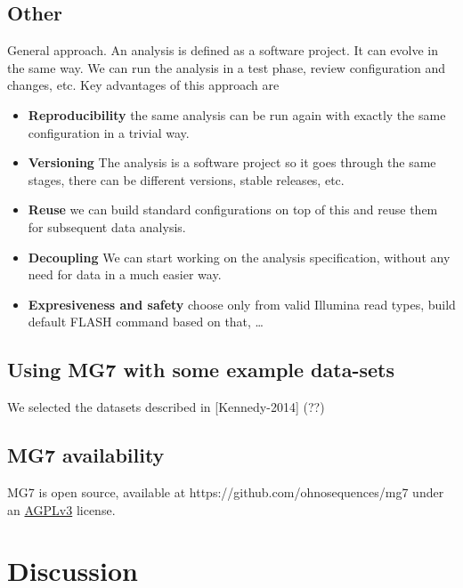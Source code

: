 \documentclass{frontiersSCNS} %
\providecommand{\tightlist}{%
\setlength{\itemsep}{0pt}\setlength{\parskip}{0pt}}
\begin{document}
\subsection{Other}\label{other}

General approach. An analysis is defined as a software project. It can
evolve in the same way. We can run the analysis in a test phase, review
configuration and changes, etc. Key advantages of this approach are

\begin{itemize}
\tightlist
\item
  \textbf{Reproducibility} the same analysis can be run again with
  exactly the same configuration in a trivial way.
\item
  \textbf{Versioning} The analysis is a software project so it goes
  through the same stages, there can be different versions, stable
  releases, etc.
\item
  \textbf{Reuse} we can build standard configurations on top of this and
  reuse them for subsequent data analysis.
\item
  \textbf{Decoupling} We can start working on the analysis
  specification, without any need for data in a much easier way.
\item
  \textbf{Expresiveness and safety} choose only from valid Illumina read
  types, build default FLASH command based on that, \ldots{}
\end{itemize}

\subsection{Using MG7 with some example
data-sets}\label{using-mg7-with-some-example-data-sets}

We selected the datasets described in {[}Kennedy-2014{]} (??)

\subsection{MG7 availability}\label{mg7-availability}

MG7 is open source, available at https://github.com/ohnosequences/mg7
under an \href{http://www.gnu.org/licenses/agpl-3.0.en.html}{AGPLv3}
license.

\section{Discussion}\label{discussion}
\end{document}

